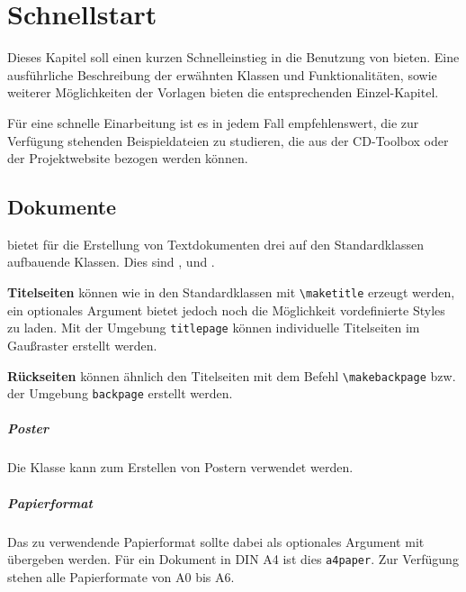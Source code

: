\chapter{Schnellstart}\label{chap:rapid}

Dieses Kapitel soll einen kurzen Schnelleinstieg in die Benutzung von
\tubslatex bieten. Eine ausführliche Beschreibung der erwähnten
Klassen und Funktionalitäten, sowie weiterer Möglichkeiten der Vorlagen
bieten die entsprechenden Einzel-Kapitel.

Für eine schnelle Einarbeitung ist es in jedem Fall empfehlenswert, die
zur Verfügung stehenden Beispieldateien zu studieren, die aus der
CD-Toolbox oder der Projektwebsite bezogen werden können.

\section{Dokumente}
\tubslatex bietet für die Erstellung von Textdokumenten drei auf den
Standardklassen aufbauende Klassen. Dies sind ,
 und .

\textbf{Titelseiten} können wie in den Standardklassen mit \lstinline{\maketitle}
erzeugt werden, ein optionales Argument bietet jedoch noch die Möglichkeit
vordefinierte Styles zu laden.
Mit der Umgebung \lstinline{titlepage} können individuelle Titelseiten
im Gaußraster erstellt werden.

\textbf{Rückseiten} können ähnlich den Titelseiten mit dem Befehl
\lstinline{\makebackpage} bzw. der Umgebung \lstinline{backpage} erstellt werden.



\paragraph{Poster}
Die Klasse  kann zum Erstellen von Postern verwendet werden.

\paragraph{Papierformat}
Das zu verwendende Papierformat sollte dabei als optionales Argument mit
übergeben werden. Für ein Dokument in DIN A4 ist dies \texttt{a4paper}.
Zur Verfügung stehen alle Papierformate von A0 bis A6.

